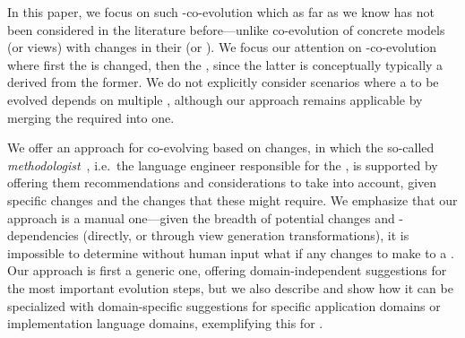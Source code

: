 In this paper, we focus on such \metamodel-\viewtype co-evolution which as far as we know has not been considered in the literature before---unlike co-evolution of concrete models (or views) with changes in their \metamodel (or \viewtype). %
We focus our attention on \metamodel-\viewtype co-evolution where first the \metamodel is changed, then the \viewtype, since the latter is conceptually typically a \metamodel derived from the former. %
We do not explicitly consider scenarios where a \viewtype to be evolved depends on multiple \metamodels, although our approach remains applicable by merging the required \metamodels into one. %

We offer an approach for co-evolving \viewtypes based on \metamodel changes, in which the so-called \textit{methodologist}~\Textcite{atkinson_orthographic_2010}, i.e.~the language engineer responsible for the \viewtype, is supported by offering them recommendations and considerations to take into account, given specific \metamodel changes and the \viewtype changes that these might require. We emphasize that our approach is a manual one---given the breadth of potential \metamodel changes and \viewtypes-\metamodel dependencies (directly, or through view generation transformations), it is impossible to determine without human input what if any changes to make to a \viewtype.
Our approach is first a generic one, offering domain-independent suggestions for the most important \metamodel evolution steps, but we also describe and show how it can be specialized with domain-specific suggestions for specific application domains or implementation language domains, exemplifying this for .

